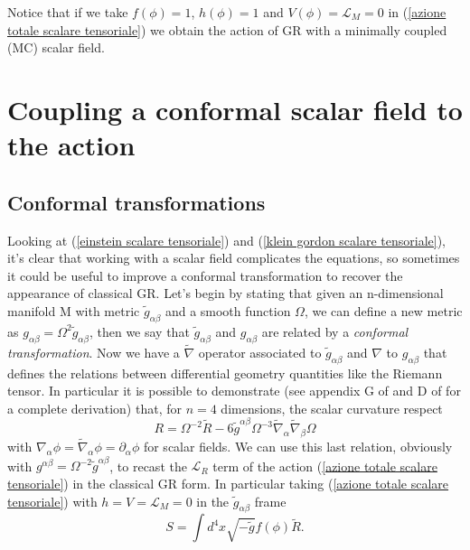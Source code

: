 Notice that if we take $f(\phi) = 1$, $h(\phi) = 1$ and $V(\phi)=\mathcal{L}_M=0$ in (\ref{azione totale scalare tensoriale}) we obtain the action of GR with a minimally coupled (MC) scalar field. 
\section{Coupling a conformal scalar field to the action}
\subsection{Conformal transformations}
Looking at (\ref{einstein scalare tensoriale}) and (\ref{klein gordon scalare tensoriale}), it's clear that working with a scalar field complicates the equations, so sometimes it could be useful to improve a conformal transformation to recover the appearance of classical GR. Let's begin by stating that given an n-dimensional manifold M with metric $\tilde{g}_{\alpha \beta}$ and a smooth function $\Omega$, we can define a new metric as $g_{\alpha \beta} = \Omega^2 \tilde{g}_{\alpha \beta}$, then we say that $\tilde{g}_{\alpha \beta}$ and $g_{\alpha \beta}$ are related by a \emph{conformal transformation}. Now we have a $\tilde{\nabla}$ operator associated to $\tilde{g}_{\alpha \beta}$ and $\nabla$ to $g_{\alpha \beta}$ that defines the relations between differential geometry quantities like the Riemann tensor. In particular it is possible to demonstrate (see appendix G of \citep{Carroll_2019} and D of \citep{wald2010general} for a complete derivation) that, for $n=4$ dimensions, the scalar curvature respect
\begin{equation}
    R = \Omega^{-2}\tilde{R} -6\tilde{g}^{\alpha \beta}\Omega^{-3}\tilde{\nabla}_{\alpha}\tilde{\nabla}_{\beta}\Omega
    \label{relazione R conforme e non}
\end{equation}
with $\nabla_{\alpha}\phi = \tilde{\nabla}_{\alpha}\phi = \partial_{\alpha}\phi$ for scalar fields. We can use this last relation, obviously with $g^{\alpha \beta} = \Omega ^{-2}\tilde{g}^{\alpha \beta}$, to recast the $\mathcal{L}_R$ term of the action (\ref{azione totale scalare tensoriale}) in the classical GR form. 
In particular taking (\ref{azione totale scalare tensoriale}) with $h = V = \mathcal{L}_M = 0$ in the $\tilde{g}_{\alpha \beta}$ frame
\begin{equation}
    S = \int d^4x\sqrt{-\tilde{g}}f(\phi)\tilde{R}. 
\end{equation}
